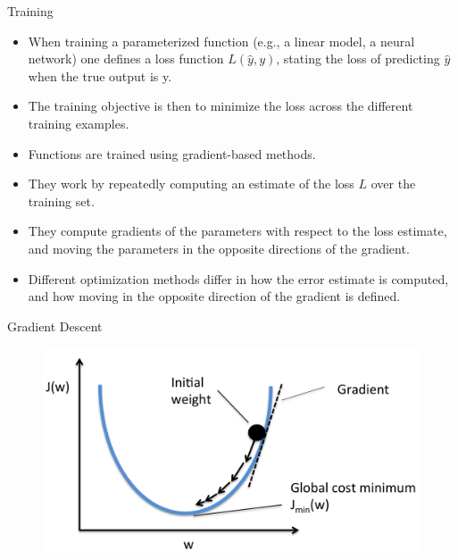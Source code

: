 \documentclass[handout]{beamer}
\begin{document}
\begin{frame}{Training}
\begin{scriptsize}
\begin{itemize}
\item  When training a parameterized function (e.g., a linear model, a neural network) one defines a loss function $L(\hat{y}, y)$, stating the loss of predicting $\hat{y}$ when the true output is y.

\item The training objective is then to minimize the loss across the different training examples. 

\item Functions are trained using  gradient-based methods.

\item They work by repeatedly computing an estimate of the loss $L$ over the training set.

\item They compute gradients of the parameters with respect to the loss estimate, and moving the parameters in the opposite directions of the gradient. 

\item Different optimization methods differ in how the error estimate is computed, and how moving in the opposite direction of the gradient is defined.

\end{itemize}


\end{scriptsize}
\end{frame}



\begin{frame}{Gradient Descent}
\begin{figure}[htb]
	\centering
	 \includegraphics[scale=0.15]{pics/sgd.png}
\end{figure}



\end{frame}
\end{document}
